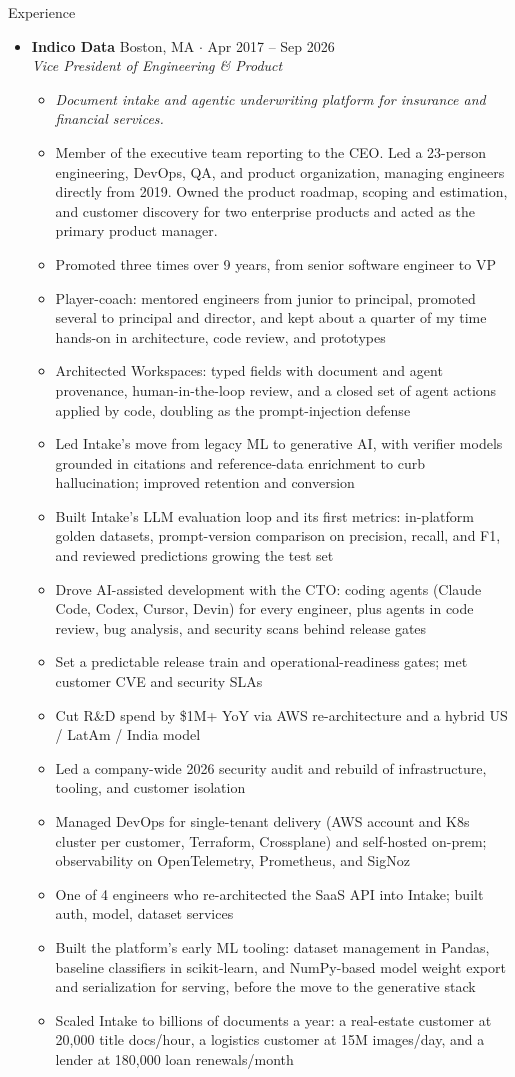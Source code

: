 \documentclass[10pt,oneside]{article}
\newenvironment{ressection}[1]{
  \vspace{4pt}
  {\fontfamily{phv}\selectfont\Large#1}
  \begin{itemize}
    \vspace{3pt}
}{
  \end{itemize}
}
\newcommand{\ressubitem}[1]{
  \vspace{-1pt}
\item \begin{flushleft} #1 \end{flushleft}
}
\newcommand{\rescontext}[1]{
  \vspace{-3pt}
\item[] \begin{flushleft} \textit{\small #1} \end{flushleft}
}
\newcommand{\resscope}[1]{
  \vspace{-3pt}
\item[] \begin{flushleft} #1 \end{flushleft}
}
\newcommand{\resbigitem}[3]{
  \vspace{-5pt}
\item
  \textbf{#1} \hfill #2 \\
  \textit{#3}
}
\newenvironment{ressubsec}[3]{
  \resbigitem{#1}{#2}{#3}
  \vspace{-2pt}
  \begin{itemize}
}{
  \end{itemize}
}
\begin{document}
\begin{ressection}{Experience}

  \begin{ressubsec}{Indico Data}{Boston, MA \; $\cdot$ \; Apr 2017 -- Sep 2026}{Vice President of Engineering \& Product}
    \rescontext{Document intake and agentic underwriting platform for insurance and financial services.}
    \resscope{Member of the executive team reporting to the CEO. Led a 23-person engineering, DevOps, QA, and product organization, managing engineers directly from 2019. Owned the product roadmap, scoping and estimation, and customer discovery for two enterprise products and acted as the primary product manager.}
    \ressubitem{Promoted three times over 9 years, from senior software engineer to VP}
    \ressubitem{Player-coach: mentored engineers from junior to principal, promoted several to principal and director, and kept about a quarter of my time hands-on in architecture, code review, and prototypes}
    \ressubitem{Architected Workspaces: typed fields with document and agent provenance, human-in-the-loop review, and a closed set of agent actions applied by code, doubling as the prompt-injection defense}
    \ressubitem{Led Intake's move from legacy ML to generative AI, with verifier models grounded in citations and reference-data enrichment to curb hallucination; improved retention and conversion}
    \ressubitem{Built Intake's LLM evaluation loop and its first metrics: in-platform golden datasets, prompt-version comparison on precision, recall, and F1, and reviewed predictions growing the test set}
    \ressubitem{Drove AI-assisted development with the CTO: coding agents (Claude Code, Codex, Cursor, Devin) for every engineer, plus agents in code review, bug analysis, and security scans behind release gates}
    \ressubitem{Set a predictable release train and operational-readiness gates; met customer CVE and security SLAs}
    \ressubitem{Cut R\&D spend by \$1M+ YoY via AWS re-architecture and a hybrid US / LatAm / India model}
    \ressubitem{Led a company-wide 2026 security audit and rebuild of infrastructure, tooling, and customer isolation}
    \ressubitem{Managed DevOps for single-tenant delivery (AWS account and K8s cluster per customer, Terraform, Crossplane) and self-hosted on-prem; observability on OpenTelemetry, Prometheus, and SigNoz}
    \ressubitem{One of 4 engineers who re-architected the SaaS API into Intake; built auth, model, dataset services}
    \ressubitem{Built the platform's early ML tooling: dataset management in Pandas, baseline classifiers in scikit-learn, and NumPy-based model weight export and serialization for serving, before the move to the generative stack}
    \ressubitem{Scaled Intake to billions of documents a year: a real-estate customer at 20{,}000 title docs/hour, a logistics customer at 15M images/day, and a lender at 180{,}000 loan renewals/month}
  \end{ressubsec}


\end{ressection}
\end{document}
